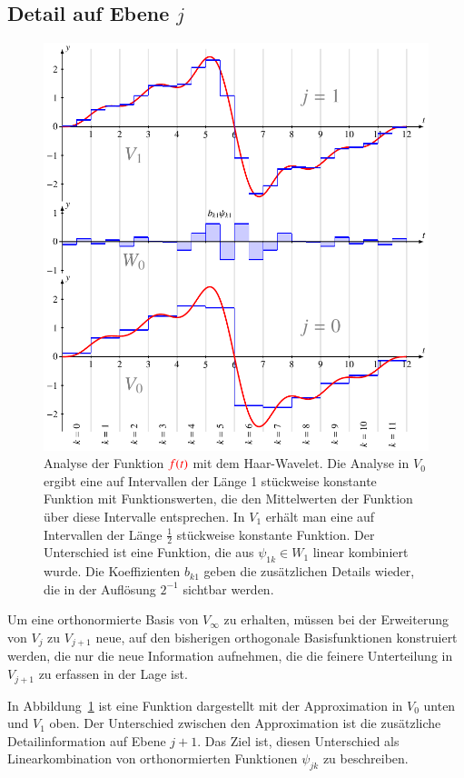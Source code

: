 \subsection{Detail auf Ebene $j$}
\begin{figure}
\centering
\includegraphics{chapters/3-haar/images/detail.pdf}
\caption{Analyse der Funktion $\color{red}f(t)$ mit dem Haar-Wavelet.
Die Analyse in $V_0$ ergibt eine auf Intervallen der Länge 1 stückweise
konstante Funktion mit Funktionswerten, die den Mittelwerten der Funktion
über diese Intervalle entsprechen.
In $V_1$ erhält man eine auf Intervallen der Länge $\frac12$ stückweise
konstante Funktion.
Der Unterschied ist eine Funktion, die aus $\psi_{1k}\in W_1$ linear
kombiniert wurde.
Die Koeffizienten $b_{k1}$ geben die zusätzlichen Details wieder,
die in der Auflösung $2^{-1}$ sichtbar werden.
\label{haar:figure:detail}}
\end{figure}
Um eine orthonormierte Basis von $V_\infty$ zu erhalten, müssen
bei der Erweiterung von $V_j$ zu $V_{j+1}$ neue, auf den bisherigen
orthogonale Basisfunktionen konstruiert werden, die nur die neue
Information aufnehmen, die die feinere Unterteilung in $V_{j+1}$
zu erfassen in der Lage ist.

In Abbildung~\ref{haar:figure:detail} ist eine Funktion dargestellt mit
der Approximation in $V_0$ unten und $V_1$ oben.
Der Unterschied zwischen den Approximation ist die zusätzliche
Detailinformation auf Ebene $j+1$.
Das Ziel ist, diesen Unterschied als Linearkombination von orthonormierten
Funktionen $\psi_{jk}$ zu beschreiben.

